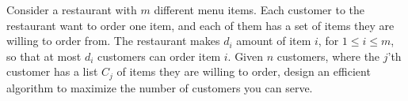 \problem{}
Consider a restaurant with $m$ different menu items. Each customer to the restaurant want to order one item, and each of them has a set of items they are willing to order from. The restaurant makes $d_i$ amount of item $i$, for $1 \leq i \leq m$, so that at most $d_i$ customers can order item $i$. Given $n$ customers, where the $j$'th customer has a list $C_j$ of items they are willing to order, design an efficient algorithm to maximize the number of customers you can serve.

\solution{}








\newpage